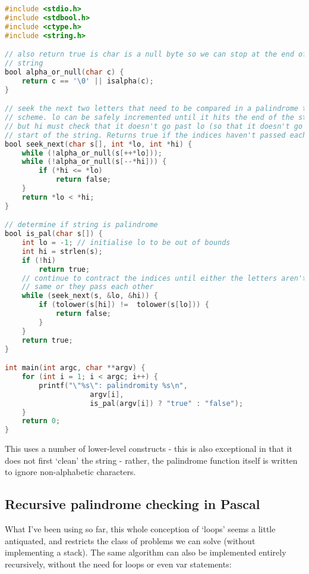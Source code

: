 \documentclass{article}
\begin{document}
\begin{lstlisting}[language=C, caption=Palindrome function in C]
#include <stdio.h>
#include <stdbool.h>
#include <ctype.h>
#include <string.h>

// also return true is char is a null byte so we can stop at the end of the
// string
bool alpha_or_null(char c) {
    return c == '\0' || isalpha(c);
}

// seek the next two letters that need to be compared in a palindrome testing
// scheme. lo can be safely incremented until it hits the end of the string,
// but hi must check that it doesn't go past lo (so that it doesn't go past hte
// start of the string. Returns true if the indices haven't passed each other.
bool seek_next(char s[], int *lo, int *hi) {
    while (!alpha_or_null(s[++*lo]));
    while (!alpha_or_null(s[--*hi])) {
        if (*hi <= *lo)
            return false;
    }
    return *lo < *hi;
}

// determine if string is palindrome
bool is_pal(char s[]) {
    int lo = -1; // initialise lo to be out of bounds
    int hi = strlen(s);
    if (!hi)
        return true;
    // continue to contract the indices until either the letters aren't the
    // same or they pass each other
    while (seek_next(s, &lo, &hi)) {
        if (tolower(s[hi]) !=  tolower(s[lo])) {
            return false;
        }
    }
    return true;
}

int main(int argc, char **argv) {
    for (int i = 1; i < argc; i++) {
        printf("\"%s\": palindromity %s\n",
                    argv[i],
                    is_pal(argv[i]) ? "true" : "false");
    }
    return 0;
}
\end{lstlisting}

    This uses a number of lower-level constructs - this is also exceptional in
    that it does not first `clean' the string - rather, the palindrome function
    itself is written to ignore non-alphabetic characters.

    \subsection{Recursive palindrome checking in Pascal}

    What I've been using so far, this whole conception of `loops'
    seems a little antiquated, and restricts the class of problems we can solve
    (without implementing a stack). The same algorithm can also be implemented
    entirely recursively, without the need for loops or even var statements:
\end{document}
